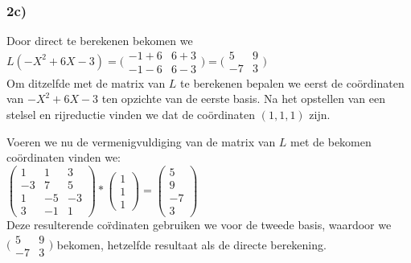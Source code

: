 \documentclass[lineaire_algebra_oplossingen.tex]{subfiles}
\begin{document}
\subsubsection*{2c)}

Door direct te berekenen bekomen we\\

$ L(-X^2+6X-3) = \bigl(
\begin{smallmatrix}
-1+6&6+3\\ -1-6&6-3
\end{smallmatrix}\bigr) = \bigl(
\begin{smallmatrix}
5&9\\ -7&3
\end{smallmatrix}\bigr)$\\

Om ditzelfde met de matrix van $L$ te berekenen bepalen we eerst de co\"ordinaten van $-X^2+6X-3$ ten opzichte van de eerste basis.
Na het opstellen van een stelsel en rijreductie vinden we dat de co\"ordinaten $(1,1,1)$ zijn.

Voeren we nu de vermenigvuldiging van de matrix van $L$ met de bekomen co\"ordinaten vinden we:\\

$\begin{pmatrix}
1 & 1 & 3\\
-3 & 7 & 5\\
1 & -5 & -3\\
3 & -1 & 1
\end{pmatrix} * \begin{pmatrix}
1\\
1\\
1
\end{pmatrix} = \begin{pmatrix}
5\\
9\\
-7\\
3
\end{pmatrix}$\\

Deze resulterende co\"rdinaten gebruiken we voor de tweede basis, waardoor we $\bigl(
\begin{smallmatrix}
5&9\\ -7&3
\end{smallmatrix}\bigr)$ bekomen, hetzelfde resultaat als de directe berekening.
\end{document}
